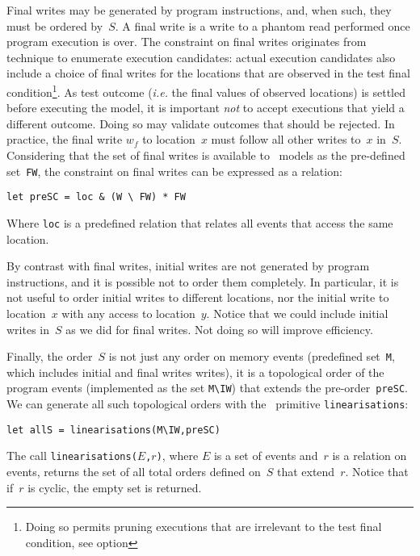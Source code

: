 Final writes may be  generated by program instructions, and, when such,
they must be ordered by~$S$.
A final write is a write to a phantom read performed once
program execution is over.
The constraint on final writes
originates from \herd{} technique to enumerate execution candidates:
actual execution candidates also include a choice of final writes for
the locations that are observed in the test final condition\footnote{Doing
so permits pruning executions that are irrelevant to the test final condition,
see \herd{} option }.
As test outcome (\emph{i.e.} the final values of observed locations) is
settled before executing the model, it is important \emph{not} to accept
executions that yield a different outcome. Doing so may validate outcomes
that should be rejected.
In practice, the final write $w_f$
to location~$x$ must follow all other writes to~$x$ in~$S$.
Considering that the set of final writes is available to \cat{}~models
as the pre-defined set~\verb+FW+,
the  constraint on final writes
can be expressed as a relation:
\begin{verbatim}
let preSC = loc & (W \ FW) * FW
\end{verbatim}
Where \verb+loc+ is a predefined relation that relates all events
that access the same location.

By contrast with final writes, initial writes are not generated
by program instructions, and it is possible not to order them completely.
In particular, it is not useful to order initial writes to different locations,
nor the initial write to location~$x$ with any access to location~$y$.
Notice that we could include initial writes in~$S$ as we did for
final writes. Not doing so will improve efficiency.

\label{intro:linearisations}%
Finally, the order~$S$ is not just any order on memory events (predefined
set~\verb+M+, which includes initial and final writes writes),
it is a topological order of the program events (implemented as the set
\verb+M\IW+) that extends the pre-order~\verb+preSC+.
We can generate all such topological orders with the \cat{}~primitive
\verb+linearisations+:
\begin{verbatim}
let allS = linearisations(M\IW,preSC)
\end{verbatim}
The call \texttt{linearisations($E$,$r$)}, where $E$ is a set of events
and~$r$ is a relation on events, returns the set of all total
orders defined on~$S$ that extend~$r$. Notice that if~$r$ is cyclic,
the empty set is  returned.

